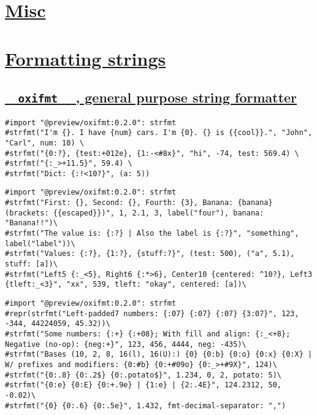 \section{\texorpdfstring{\hyperref[misc]{Misc}}{Misc}}\label{misc}

\section{\texorpdfstring{\hyperref[formatting-strings]{Formatting
strings}}{Formatting strings}}\label{formatting-strings}

\subsection{\texorpdfstring{\hyperref[oxifmt-general-purpose-string-formatter]{\texttt{\ }{\texttt{\ oxifmt\ }}\texttt{\ }
, general purpose string
formatter}}{  oxifmt   , general purpose string formatter}}\label{oxifmt-general-purpose-string-formatter}

\begin{verbatim}
#import "@preview/oxifmt:0.2.0": strfmt
#strfmt("I'm {}. I have {num} cars. I'm {0}. {} is {{cool}}.", "John", "Carl", num: 10) \
#strfmt("{0:?}, {test:+012e}, {1:-<#8x}", "hi", -74, test: 569.4) \
#strfmt("{:_>+11.5}", 59.4) \
#strfmt("Dict: {:!<10?}", (a: 5))
\end{verbatim}

\pandocbounded{}

\begin{verbatim}
#import "@preview/oxifmt:0.2.0": strfmt
#strfmt("First: {}, Second: {}, Fourth: {3}, Banana: {banana} (brackets: {{escaped}})", 1, 2.1, 3, label("four"), banana: "Banana!!")\
#strfmt("The value is: {:?} | Also the label is {:?}", "something", label("label"))\
#strfmt("Values: {:?}, {1:?}, {stuff:?}", (test: 500), ("a", 5.1), stuff: [a])\
#strfmt("Left5 {:_<5}, Right6 {:*>6}, Center10 {centered: ^10?}, Left3 {tleft:_<3}", "xx", 539, tleft: "okay", centered: [a])\
\end{verbatim}

\pandocbounded{}

\begin{verbatim}
#import "@preview/oxifmt:0.2.0": strfmt
#repr(strfmt("Left-padded7 numbers: {:07} {:07} {:07} {3:07}", 123, -344, 44224059, 45.32))\
#strfmt("Some numbers: {:+} {:+08}; With fill and align: {:_<+8}; Negative (no-op): {neg:+}", 123, 456, 4444, neg: -435)\
#strfmt("Bases (10, 2, 8, 16(l), 16(U):) {0} {0:b} {0:o} {0:x} {0:X} | W/ prefixes and modifiers: {0:#b} {0:+#09o} {0:_>+#9X}", 124)\
#strfmt("{0:.8} {0:.2$} {0:.potato$}", 1.234, 0, 2, potato: 5)\
#strfmt("{0:e} {0:E} {0:+.9e} | {1:e} | {2:.4E}", 124.2312, 50, -0.02)\
#strfmt("{0} {0:.6} {0:.5e}", 1.432, fmt-decimal-separator: ",")
\end{verbatim}

